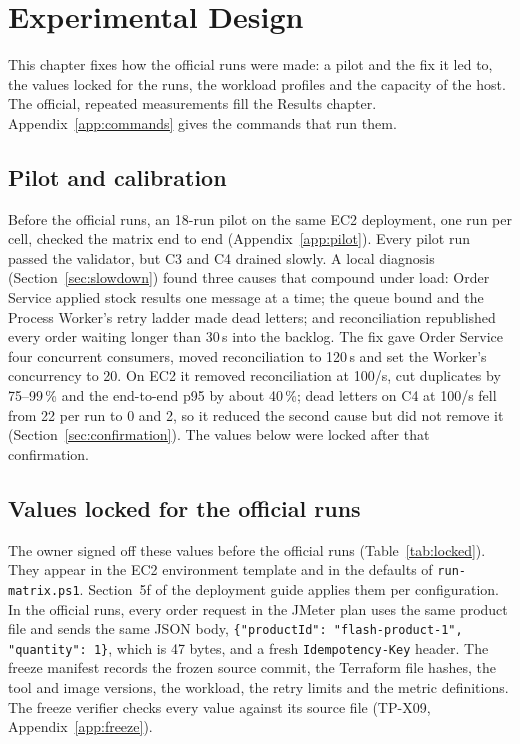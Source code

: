 \documentclass[a4paper]{report}
\begin{document}
\chapter{Experimental Design}
\label{sec:experimental-design}
This chapter fixes how the official runs were made: a pilot and the fix it
led to, the values locked for the runs, the workload profiles and the capacity
of the host. The official, repeated measurements fill the Results chapter.
Appendix~\ref{app:commands} gives the commands that run them.

\section{Pilot and calibration}
\label{sec:pilot-summary}

Before the official runs, an 18-run pilot on the same EC2 deployment, one run
per cell, checked the matrix end to end (Appendix~\ref{app:pilot}). Every pilot
run passed the validator, but C3 and C4 drained slowly. A local diagnosis
(Section~\ref{sec:slowdown}) found three causes that compound under load: Order
Service applied stock results one message at a time; the queue bound and the
Process Worker's retry ladder made dead letters; and reconciliation
republished every order waiting longer than 30\,s into the backlog. The fix
gave Order Service four concurrent consumers, moved reconciliation to 120\,s
and set the Worker's concurrency to 20. On EC2 it removed reconciliation at
100/s, cut duplicates by 75--99\,\% and the end-to-end p95 by about 40\,\%; dead
letters on C4 at 100/s fell from 22 per run to 0 and 2, so it reduced the
second cause but did not remove it (Section~\ref{sec:confirmation}). The values
below were locked after that confirmation.

\section{Values locked for the official runs}
\label{sec:locked}

The owner signed off these values before the official runs
(Table~\ref{tab:locked}). They appear in the EC2 environment template and in
the defaults of \texttt{run-matrix.ps1}. Section~5f of the deployment guide
applies them per configuration. In the official runs, every order request
in the JMeter plan uses the same product file and sends the same JSON body,
\texttt{\{"productId": "flash-product-1", "quantity": 1\}}, which is 47 bytes,
and a fresh \texttt{Idempotency-Key} header. The freeze manifest records the
frozen source commit, the Terraform file hashes, the tool and image versions,
the workload, the retry limits and the metric definitions. The freeze
verifier checks every value against its source file (TP-X09,
Appendix~\ref{app:freeze}).
\end{document}
